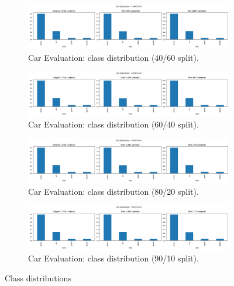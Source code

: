 \begin{figure}[H]
	\centering
	\begin{subfigure}{0.45\textwidth}
		\centering
		\includegraphics[width=\textwidth]{imgs/class_dist/class_dist__car_evaluation__40_vs_60.png}
		\caption{Car Evaluation: class distribution (40/60 split).}\label{fig:ce-cd-40-60}
	\end{subfigure}
	\hfill
	\begin{subfigure}{0.45\textwidth}
		\centering
		\includegraphics[width=\textwidth]{imgs/class_dist/class_dist__car_evaluation__60_vs_40.png}
		\caption{Car Evaluation: class distribution (60/40 split).}\label{fig:ce-cd-60-40}
	\end{subfigure}
	\hfill
	\begin{subfigure}{0.45\textwidth}
		\centering
		\includegraphics[width=\textwidth]{imgs/class_dist/class_dist__car_evaluation__80_vs_20.png}
		\caption{Car Evaluation: class distribution (80/20 split).}\label{fig:ce-cd-80-20}
	\end{subfigure}
	\hfill
	\begin{subfigure}{0.45\textwidth}
		\centering
		\includegraphics[width=\textwidth]{imgs/class_dist/class_dist__car_evaluation__90_vs_10.png}
		\caption{Car Evaluation: class distribution (90/10 split).}\label{fig:ce-cd-90-10}
	\end{subfigure}

	\caption{Class distributions}\label{fig:ce-cd-all}
\end{figure}

